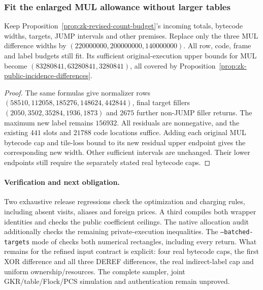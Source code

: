 \subsubsection{Fit the enlarged MUL allowance without larger tables}

\begin{corollary}\label{cor:zk-incidence-count-budget}
Keep Proposition~\ref{prop:zk-revised-count-budget}'s incoming totals, bytecode widths, targets, JUMP intervals and other premises. Replace only the three MUL difference widths by $(220000000,200000000,140000000)$. All row, code, frame and label budgets still fit. Its sufficient original-execution upper bounds for MUL become $(83280841,63280841,3280841)$, all covered by Proposition~\ref{prop:zk-public-incidence-differences}.
\end{corollary}
\begin{proof}
The same formulas give normalizer rows $(58510,112058,185276,148624,442844)$, final target fillers $(2050,3502,35284,1936,1873)$ and $2675$ further non-JUMP filler returns. The maximum new label remains $156932$. All residuals are nonnegative, and the existing $441$ slots and $21788$ code locations suffice. Adding each original MUL bytecode cap and tile-loss bound to its new residual upper endpoint gives the corresponding new width. Other sufficient intervals are unchanged. Their lower endpoints still require the separately stated real bytecode caps.
\end{proof}

\paragraph{Verification and next obligation.} Two exhaustive release regressions check the optimization and charging rules, including absent visits, aliases and foreign prices. A third compiles both wrapper identities and checks the public coefficient ceilings. The native allocation audit additionally checks the remaining private-execution inequalities. The \texttt{--batched-targets} mode of  checks both numerical rectangles, including every return. What remains for the refined input contract is explicit: four real bytecode caps, the first XOR difference and all three DEREF differences, the real indirect-label cap and uniform ownership/resources. The complete sampler, joint GKR/table/Flock/PCS simulation and authentication remain unproved.
